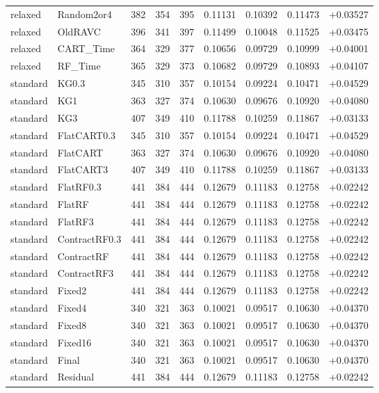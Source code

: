 \begin{longtable}{@{}llrrrrrrr@{}}
relaxed & Random2or4 & 382 & 354 & 395 & 0.11131 & 0.10392 & 0.11473 & +0.03527\\
relaxed & OldRAVC & 396 & 341 & 397 & 0.11499 & 0.10048 & 0.11525 & +0.03475\\
relaxed & CART\_Time & 364 & 329 & 377 & 0.10656 & 0.09729 & 0.10999 & +0.04001\\
relaxed & RF\_Time & 365 & 329 & 373 & 0.10682 & 0.09729 & 0.10893 & +0.04107\\
standard & KG0.3 & 345 & 310 & 357 & 0.10154 & 0.09224 & 0.10471 & +0.04529\\
standard & KG1 & 363 & 327 & 374 & 0.10630 & 0.09676 & 0.10920 & +0.04080\\
standard & KG3 & 407 & 349 & 410 & 0.11788 & 0.10259 & 0.11867 & +0.03133\\
standard & FlatCART0.3 & 345 & 310 & 357 & 0.10154 & 0.09224 & 0.10471 & +0.04529\\
standard & FlatCART & 363 & 327 & 374 & 0.10630 & 0.09676 & 0.10920 & +0.04080\\
standard & FlatCART3 & 407 & 349 & 410 & 0.11788 & 0.10259 & 0.11867 & +0.03133\\
standard & FlatRF0.3 & 441 & 384 & 444 & 0.12679 & 0.11183 & 0.12758 & +0.02242\\
standard & FlatRF & 441 & 384 & 444 & 0.12679 & 0.11183 & 0.12758 & +0.02242\\
standard & FlatRF3 & 441 & 384 & 444 & 0.12679 & 0.11183 & 0.12758 & +0.02242\\
standard & ContractRF0.3 & 441 & 384 & 444 & 0.12679 & 0.11183 & 0.12758 & +0.02242\\
standard & ContractRF & 441 & 384 & 444 & 0.12679 & 0.11183 & 0.12758 & +0.02242\\
standard & ContractRF3 & 441 & 384 & 444 & 0.12679 & 0.11183 & 0.12758 & +0.02242\\
standard & Fixed2 & 441 & 384 & 444 & 0.12679 & 0.11183 & 0.12758 & +0.02242\\
standard & Fixed4 & 340 & 321 & 363 & 0.10021 & 0.09517 & 0.10630 & +0.04370\\
standard & Fixed8 & 340 & 321 & 363 & 0.10021 & 0.09517 & 0.10630 & +0.04370\\
standard & Fixed16 & 340 & 321 & 363 & 0.10021 & 0.09517 & 0.10630 & +0.04370\\
standard & Final & 340 & 321 & 363 & 0.10021 & 0.09517 & 0.10630 & +0.04370\\
standard & Residual & 441 & 384 & 444 & 0.12679 & 0.11183 & 0.12758 & +0.02242\\

\end{longtable}
